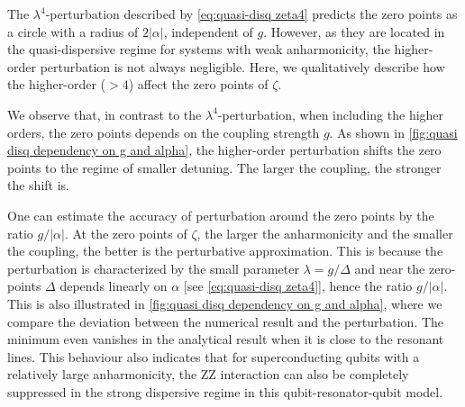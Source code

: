 \documentclass[%
 reprint,
 amsmath,amssymb,
 aps,
pra,
noeprint,
superscriptaddress,
]{revtex4-2}
\begin{document}
The $\lambda^4$-perturbation described by \cref{eq:quasi-disq zeta4} predicts the zero points as a circle with a radius of $2|\alpha|$, independent of $g$.
However, as they are located in the quasi-dispersive regime for systems with weak anharmonicity, the higher-order perturbation is not always negligible.
Here, we qualitatively describe how the higher-order ($>4$) affect the zero points of $\zeta$. 

We observe that, in contrast to the $\lambda^4$-perturbation, when including the higher orders, the zero points depends on the coupling strength $g$.
As shown in \cref{fig:quasi disq dependency on g and alpha}, the higher-order perturbation shifts the zero points to the regime of smaller detuning.
The larger the coupling, the stronger the shift is.

One can estimate the accuracy of perturbation around the zero points by the ratio $g/|\alpha|$.
At the zero points of $\zeta$, the larger the anharmonicity and the smaller the coupling, the better is the perturbative approximation.
This is because the perturbation is characterized by the small parameter $\lambda=g/\Delta$ and near the zero-points $\Delta$ depends linearly on $\alpha$ [see \cref{eq:quasi-disq zeta4}],
hence the ratio $g/|\alpha|$.
This is also illustrated in \cref{fig:quasi disq dependency on g and alpha}, where we compare the deviation between the numerical result and the perturbation.
The minimum even vanishes in the analytical result when it is close to the resonant lines.
This behaviour also indicates that for superconducting qubits with a relatively large anharmonicity, the ZZ interaction can also be completely suppressed in the strong dispersive regime in this qubit-resonator-qubit model.
\end{document}
